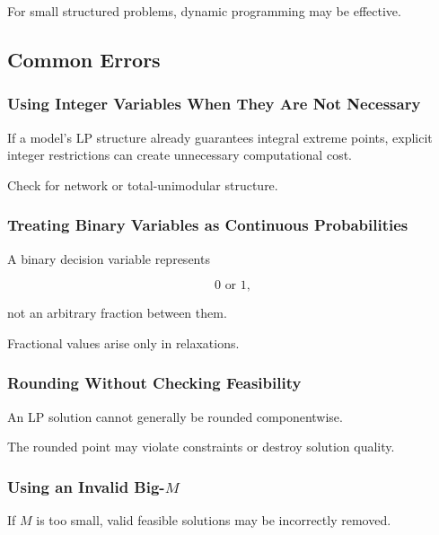 For small structured problems, dynamic programming may be effective.

\subsection{Common Errors}
\label{subsec:integer-programming-common-errors}

\subsubsection{Using Integer Variables When They Are Not Necessary}

If a model's LP structure already guarantees integral extreme points,
explicit integer restrictions can create unnecessary computational cost.

Check for network or total-unimodular structure.

\subsubsection{Treating Binary Variables as Continuous Probabilities}

A binary decision variable represents

\[
\boxed{
0
\text{ or }
1,
}
\]

not an arbitrary fraction between them.

Fractional values arise only in relaxations.

\subsubsection{Rounding Without Checking Feasibility}

An LP solution cannot generally be rounded componentwise.

The rounded point may violate constraints or destroy solution quality.

\subsubsection{Using an Invalid Big-\(M\)}

If \(M\) is too small, valid feasible solutions may be incorrectly
removed.

